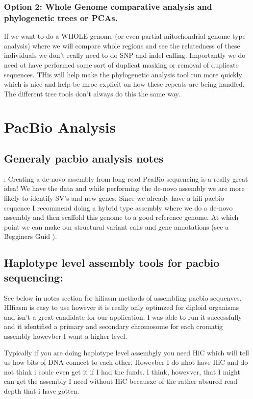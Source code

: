 \documentclass{article}
\begin{document}
    \newpage
    \subsubsection{\textbf{Option 2: Whole Genome comparative analysis and phylogenetic trees or PCAs.}}If we want to do a WHOLE genome (or even partial mitochondrial genome type analysis) where we will compare whole regions and see the relatedness of these individuals we don't really need to do SNP and indel calling.  Importantly we do need ot have performed some sort of duplicat masking or removal of duplicate sequences.   THis will help make the phylogenetic analysis tool run more quickly which is nice and help be mroe explicit on how these repeats are being handled.   The different tree tools don't always do this the same way.


    \newpage
    \section{PacBio Analysis}
    \subsection{Generaly pacbio analysis notes}: Creating a de-novo assembly from long read PcaBio sequencing is a really great idea!   We have the data and while performing the de-novo assembly we are more likely to identify SV's and new genes.   Since we already have a hifi pacbio sequence I recommend doing a hybrid type assembly where we do a de-novo assembly and then scaffold this genome to a good reference genome.  At which point we can make our structural variant calls and gene annotations (see a Begginers Guid \cite{kimBeginnersGuideAssembling2022}).


    \subsection{Haplotype level assembly tools for pacbio sequencing:}  See below in notes section for hifiasm methods of assembling pacbio sequenves.   HIfiasm is easy to use however it is really only optimzed for diploid organisms and isn't a great candidate for our application.   I was able to run it successfully and it identified a primary and secondary chromosome for each cromatig assembly howevber I want a higher level.

    Typically if you are doing haplotype level assembgly you need HiC which will tell us how bits of DNA connect to each other.  Howevber I do nhot have HiC and do not think i coule even get it if I had the funds.   I think, howevver, that I might can get the assembly I need without HiC becausxe of the rather absured read depth that i have gotten. 
\end{document}
